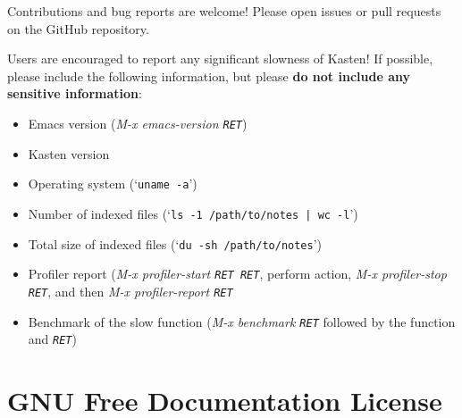 \documentclass{book}
\newcommand\Texinfocommandstyletextkbd[1]{{\ttfamily\textsl{#1}}}%
\renewcommand{\_}{\Texinfounderscore\discretionary{}{}{}}
\begin{document}
Contributions and bug reports are welcome! Please open issues or pull requests
on the GitHub repository.

Users are encouraged to report any significant slowness of Kasten! If possible,
please include the following information, but please \textbf{do not include any
sensitive information}:
\begin{itemize}
\item Emacs version (\Texinfocommandstyletextkbd{M-x emacs-version \texttt{RET}})
\item Kasten version
\item Operating system (`\texttt{uname -a}')
\item Number of indexed files (`\texttt{ls -1 /path/to/notes | wc -l}')
\item Total size of indexed files (`\texttt{du -sh /path/to/notes}')
\item Profiler report (\Texinfocommandstyletextkbd{M-x profiler-start \texttt{RET}\ \texttt{RET}}, perform action,
\Texinfocommandstyletextkbd{M-x profiler-stop \texttt{RET}}, and then \Texinfocommandstyletextkbd{M-x profiler-report \texttt{RET}}
\item Benchmark of the slow function (\Texinfocommandstyletextkbd{M-x benchmark \texttt{RET}} followed by the
function and \Texinfocommandstyletextkbd{\texttt{RET}})
\end{itemize}

\appendix
\chapter{{GNU Free Documentation License}}
\label{anchor:GNU-Free-Documentation-License}%
\end{document}
